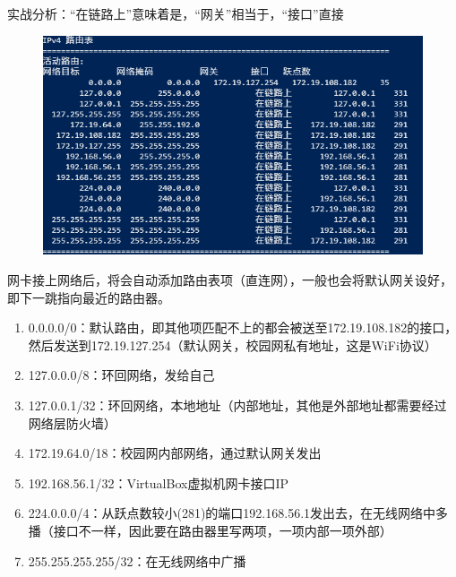 \begin{example}
	实战分析：“在链路上”意味着是，“网关”相当于，“接口”直接
	\begin{figure}[H]
		\centering
		\includegraphics[width=0.6\linewidth]{fig/my-router-table.png}
	\end{figure}
\end{example}
\begin{analysis}
	网卡接上网络后，将会自动添加路由表项（直连网），一般也会将默认网关设好，即下一跳指向最近的路由器。
	\begin{enumerate}
		\item 0.0.0.0/0：默认路由，即其他项匹配不上的都会被送至172.19.108.182的接口，\\然后发送到172.19.127.254（默认网关，校园网私有地址，这是WiFi协议）
		\item 127.0.0.0/8：环回网络，发给自己
		\item 127.0.0.1/32：环回网络，本地地址（内部地址，其他是外部地址都需要经过网络层防火墙）
		\item 172.19.64.0/18：校园网内部网络，通过默认网关发出
		\item 192.168.56.1/32：VirtualBox虚拟机网卡接口IP
		\item 224.0.0.0/4：从跃点数较小(281)的端口192.168.56.1发出去，在无线网络中多播（接口不一样，因此要在路由器里写两项，一项内部一项外部）
		\item 255.255.255.255/32：在无线网络中广播
	\end{enumerate}
\end{analysis}

